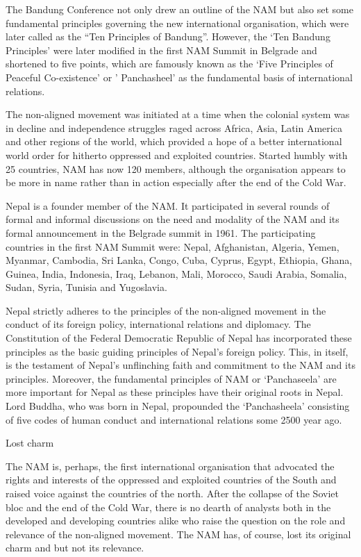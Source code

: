\documentclass[
  openany]{book}
\begin{document}
The Bandung Conference not only drew an outline of the NAM but also set some fundamental principles governing the new international organisation, which were later called as the ``Ten Principles of Bandung''. However, the `Ten Bandung Principles' were later modified in the first NAM Summit in Belgrade and shortened to five points, which are famously known as the `Five Principles of Peaceful Co-existence' or ' Panchasheel' as the fundamental basis of international relations.

The non-aligned movement was initiated at a time when the colonial system was in decline and independence struggles raged across Africa, Asia, Latin America and other regions of the world, which provided a hope of a better international world order for hitherto oppressed and exploited countries. Started humbly with 25 countries, NAM has now 120 members, although the organisation appears to be more in name rather than in action especially after the end of the Cold War.

Nepal is a founder member of the NAM. It participated in several rounds of formal and informal discussions on the need and modality of the NAM and its formal announcement in the Belgrade summit in 1961. The participating countries in the first NAM Summit were: Nepal, Afghanistan, Algeria, Yemen, Myanmar, Cambodia, Sri Lanka, Congo, Cuba, Cyprus, Egypt, Ethiopia, Ghana, Guinea, India, Indonesia, Iraq, Lebanon, Mali, Morocco, Saudi Arabia, Somalia, Sudan, Syria, Tunisia and Yugoslavia.

Nepal strictly adheres to the principles of the non-aligned movement in the conduct of its foreign policy, international relations and diplomacy. The Constitution of the Federal Democratic Republic of Nepal has incorporated these principles as the basic guiding principles of Nepal's foreign policy. This, in itself, is the testament of Nepal's unflinching faith and commitment to the NAM and its principles. Moreover, the fundamental principles of NAM or `Panchaseela' are more important for Nepal as these principles have their original roots in Nepal. Lord Buddha, who was born in Nepal, propounded the `Panchasheela' consisting of five codes of human conduct and international relations some 2500 year ago.

Lost charm

The NAM is, perhaps, the first international organisation that advocated the rights and interests of the oppressed and exploited countries of the South and raised voice against the countries of the north. After the collapse of the Soviet bloc and the end of the Cold War, there is no dearth of analysts both in the developed and developing countries alike who raise the question on the role and relevance of the non-aligned movement. The NAM has, of course, lost its original charm and but not its relevance.
\end{document}
